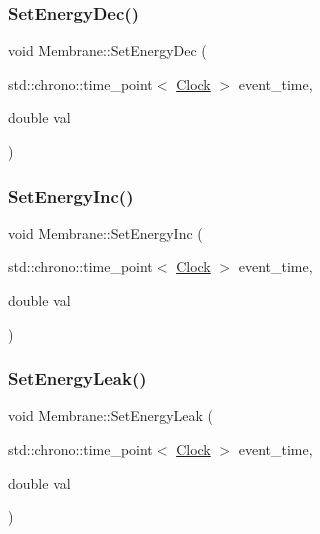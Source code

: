 \mbox{\label{classMembrane_acefb2fe781d7316b232614663777cde1}} 
\subsubsection{\texorpdfstring{Set\+Energy\+Dec()}{SetEnergyDec()}}
{\footnotesize\ttfamily void Membrane\+::\+Set\+Energy\+Dec (\begin{DoxyParamCaption}\item[{std\+::chrono\+::time\+\_\+point$<$ \mbox{\hyperlink{universe_8h_a0ef8d951d1ca5ab3cfaf7ab4c7a6fd80}{Clock}} $>$}]{event\+\_\+time,  }\item[{double}]{val }\end{DoxyParamCaption})\hspace{0.3cm}{\ttfamily [inline]}}

\mbox{\label{classMembrane_abd1c69b9b0260799afd3965c34f881ff}} 
\subsubsection{\texorpdfstring{Set\+Energy\+Inc()}{SetEnergyInc()}}
{\footnotesize\ttfamily void Membrane\+::\+Set\+Energy\+Inc (\begin{DoxyParamCaption}\item[{std\+::chrono\+::time\+\_\+point$<$ \mbox{\hyperlink{universe_8h_a0ef8d951d1ca5ab3cfaf7ab4c7a6fd80}{Clock}} $>$}]{event\+\_\+time,  }\item[{double}]{val }\end{DoxyParamCaption})\hspace{0.3cm}{\ttfamily [inline]}}

\mbox{\label{classMembrane_a96618ef2c05a8af5d6bd8606c9b8eae8}} 
\subsubsection{\texorpdfstring{Set\+Energy\+Leak()}{SetEnergyLeak()}}
{\footnotesize\ttfamily void Membrane\+::\+Set\+Energy\+Leak (\begin{DoxyParamCaption}\item[{std\+::chrono\+::time\+\_\+point$<$ \mbox{\hyperlink{universe_8h_a0ef8d951d1ca5ab3cfaf7ab4c7a6fd80}{Clock}} $>$}]{event\+\_\+time,  }\item[{double}]{val }\end{DoxyParamCaption})\hspace{0.3cm}{\ttfamily [inline]}}

